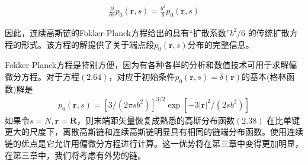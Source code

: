 \begin{gather}
\frac{\partial}{\partial s}p_0(\mathbf{r},s)=\frac{b^2}{6}p_0(\mathbf{r},s)
\end{gather}

因此，连续高斯链的Fokker-Planck方程给出的具有“扩散系数”$b^2/6$
的传统扩散方程的形式。该方程的解提供了关于端点段$p_0(\mathbf{r},s)$分布的完整信息。

Fokker-Planck方程是特别方便，因为有各种各样的分析和数值技术可用于求解偏微分方程。对于方程$(2.64)$，对应于初始条件$p_0(\mathbf{r},s)=\delta(\mathbf{r})$的基本(格林函数)解是
\begin{gather}
p_0(\mathbf{r},s)=\left[ 3/(2 \pi sb^2) \right]^{3/2}\exp \left[ -3\left| \mathbf{r} \right|^2/(2sb^2) \right]
\end{gather}
如果令$s=N,\mathbf{r}=\mathbf{R}$，则末端距矢量恢复成熟悉的高斯分布函数$(2.38)$
在比单键更大的尺度下，离散高斯链和连续高斯链明显具有相同的链端分布函数。使用连续链的优点是它允许用偏微分方程进行计算。这一优势将在第三章中变得更加明显，在第三章中，我们将考虑有外势的链。
\endinput